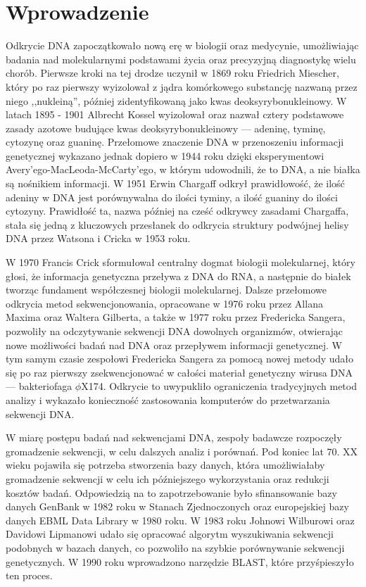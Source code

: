 \cleardoublepage

\section{Wprowadzenie}

    Odkrycie DNA zapoczątkowało nową erę w biologii oraz medycynie, umożliwiając badania nad molekularnymi podstawami życia oraz precyzyjną diagnostykę wielu chorób\cite{Louie:2000}. Pierwsze kroki na tej drodze uczynił w 1869 roku Friedrich Miescher, który po raz pierwszy wyizolował z jądra komórkowego substancję nazwaną przez niego ,,nukleiną''\cite{Dahm:2005}, później zidentyfikowaną jako kwas deoksyrybonukleinowy. W latach 1895 - 1901 Albrecht Kossel wyizolował oraz nazwał cztery podstawowe zasady azotowe budujące kwas deoksyrybonukleinowy — adeninę, tyminę, cytozynę oraz guaninę\cite{Kossel:1893}. Przełomowe znaczenie DNA w przenoszeniu informacji genetycznej wykazano jednak dopiero w 1944 roku dzięki eksperymentowi Avery'ego-MacLeoda-McCarty'ego\cite{Avery:1944}, w którym udowodnili, że to DNA, a nie białka są nośnikiem informacji. W 1951 Erwin Chargaff odkrył prawidłowość, że ilość adeniny w DNA jest porównywalna do ilości tyminy, a ilość guaniny do ilości cytozyny\cite{Chargaff:1952}. Prawidłość ta, nazwa później na cześć odkrywcy zasadami Chargaffa, stała się jedną z kluczowych przesłanek do odkrycia struktury podwójnej helisy DNA przez Watsona i Cricka w 1953 roku\cite{Watson:1953}.

    W 1970 Francis Crick sformułował centralny dogmat biologii molekularnej\cite{Crick:1970}, który głosi, że informacja genetyczna przeływa z DNA do RNA, a następnie do białek tworząc fundament współczesnej biologii molekularnej. Dalsze przełomowe odkrycia metod sekwencjonowania, opracowane w 1976 roku przez Allana Maxima oraz Waltera Gilberta\cite{Maxam:1977}, a także w 1977 roku przez Fredericka Sangera\cite{Sanger:1977}, pozwoliły na odczytywanie sekwencji DNA dowolnych organizmów, otwierając nowe możliwości badań nad DNA oraz przepływem informacji genetycznej. W tym samym czasie zespołowi Fredericka Sangera za pomocą nowej metody udało się po raz pierwszy zsekwencjonować w całości materiał genetyczny wirusa DNA — bakteriofaga $\phi{}$X174\cite{Sanger:1977_2}. Odkrycie to uwypukliło ograniczenia tradycyjnych metod analizy i wykazało konieczność zastosowania komputerów do przetwarzania sekwencji DNA\cite{Staden:1979}.

    W miarę postępu badań nad sekwencjami DNA, zespoły badawcze rozpoczęły gromadzenie sekwencji, w celu dalszych analiz i porównań. Pod koniec lat 70. XX wieku pojawiła się potrzeba stworzenia bazy danych, która umożliwiałaby gromadzenie sekwencji w celu ich późniejszego wykorzystania oraz redukcji kosztów badań. Odpowiedzią na to zapotrzebowanie było sfinansowanie bazy danych GenBank w 1982 roku w Stanach Zjednoczonych\cite{Bilofsky:1986} oraz europejskiej bazy danych EBML Data Library w 1980 roku\cite{Higgins:1992}. W 1983 roku Johnowi Wilburowi oraz Davidowi Lipmanowi udało się opracować algorytm wyszukiwania sekwencji podobnych w bazach danych\cite{Wilbur:1983}, co pozwoliło na szybkie porównywanie sekwencji genetycznych. W 1990 roku wprowadzono narzędzie BLAST\cite{Altschul:1990}, które przyśpieszyło ten proces.

